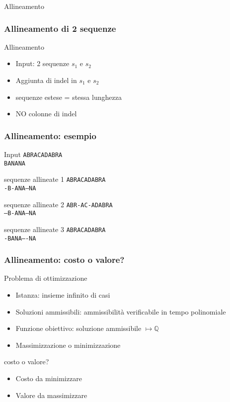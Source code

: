 



\begin{frame}
      \titlepage

        \centering
          Allineamento 
\end{frame}


\begin{frame}[fragile]
\frametitle{Allineamento di 2 sequenze}
\begin{block}{Allineamento}
\begin{itemize}
\item
Input: 2 sequenze $s_{1}$ e $s_{2}$
\item
Aggiunta di \alert{indel} in $s_{1}$ e $s_{2}$
\item
sequenze estese = stessa lunghezza
\item
NO colonne di indel
\end{itemize}
\end{block}
\end{frame}

\begin{frame}[fragile]
\frametitle{Allineamento: esempio}
\begin{block}{Input}
\texttt{ABRACADABRA}\\
\texttt{BANANA}
\end{block}

\begin{block}{sequenze allineate 1}
\texttt{ABRACADABRA}\\
\texttt{-B-ANA---NA}
\end{block}
\begin{block}{sequenze allineate 2}
\texttt{ABR-AC-ADABRA}\\
\texttt{---B-ANA---NA}
\end{block}
\begin{block}{sequenze allineate 3}
\texttt{ABRACADABRA}\\
\texttt{-BANA----NA}
\end{block}
\end{frame}

\begin{frame}[fragile]
\frametitle{Allineamento: costo o valore?}
\begin{block}{Problema di ottimizzazione}
\begin{itemize}
\item
Istanza: insieme infinito di casi
\item
Soluzioni ammissibili: ammissibilità verificabile in tempo polinomiale
\item
Funzione obiettivo: soluzione ammissibile $\mapsto \mathbb{Q}$
\item
Massimizzazione o minimizzazione
\end{itemize}
\end{block}
\begin{block}{costo o valore?}
\begin{itemize}
\item
Costo da minimizzare
\item
Valore da massimizzare
\end{itemize}
\end{block}
\end{frame}

